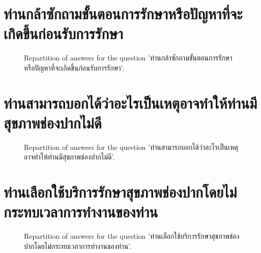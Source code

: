 \documentclass[12pt]{article}
\begin{document}
\clearpage{}
\section{ท่านกล้าซักถามขั้นตอนการรักษาหรือปัญหาที่จะเกิดขึ้นก่อนรับการรักษา}

\label{sec:126}


\begin{figure}[h!]
    \caption{\label{figure:q126-1}Repartition of answers for the question 'ท่านกล้าซักถามขั้นตอนการรักษาหรือปัญหาที่จะเกิดขึ้นก่อนรับการรักษา'.}
\end{figure}



\clearpage{}
\section{ท่านสามารถบอกได้ว่าอะไรเป็นเหตุอาจทำให้ท่านมีสุขภาพช่องปากไม่ดี}

\label{sec:127}


\begin{figure}[h!]
    \caption{\label{figure:q127-1}Repartition of answers for the question 'ท่านสามารถบอกได้ว่าอะไรเป็นเหตุอาจทำให้ท่านมีสุขภาพช่องปากไม่ดี'.}
\end{figure}



\clearpage{}
\section{ท่านเลือกใช้บริการรักษาสุขภาพช่องปากโดยไม่กระทบเวลาการทำงานของท่าน}

\label{sec:128}


\begin{figure}[h!]
    \caption{\label{figure:q128-1}Repartition of answers for the question 'ท่านเลือกใช้บริการรักษาสุขภาพช่องปากโดยไม่กระทบเวลาการทำงานของท่าน'.}
\end{figure}
\end{document}
